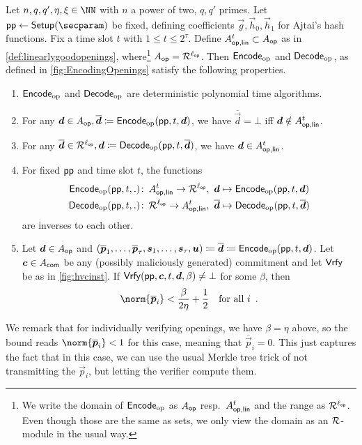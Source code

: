 \begin{theorem}\label{thm:EncodingOfOpenings}
Let $n,q,q',\eta,\xi\in\NN$ with $n$ a power of two, $q,q'$ primes.
Let $\params\gets\setup(\secparam)$ be fixed, defining coefficients $\vec{g},\vec{h}_0,\vec{h}_1$ for Ajtai's hash functions.
Fix a time slot $t$ with $1\leq t \leq 2^\tau$.
Define $A_{\mathsf{op,lin}}^{t}\subset A_{\mathsf{op}}$ as in \autoref{def:linearlygoodopenings}, where\footnote{We write the domain of $\mathsf{Encode}_{\mathrm{op}}$ as $A_{\mathsf{op}}$ resp.\ $A_{\mathsf{op,lin}}^{t}$ and the range as $\mathcal{R}^{\ell_{\mathsf{op}}}$. Even though those are the same as sets, we only view the domain as an $\mathcal{R}$-module in the usual way.} $A_{\mathsf{op}} = \mathcal{R}^{\ell_{\mathsf{op}}}$.
Then $\mathsf{Encode}_{\mathrm{op}}$ and $\mathsf{Decode}_{\mathrm{op}}$, as defined in \autoref{fig:EncodingOpenings} satisfy the following properties.
\begin{enumerate}
 \item $\mathsf{Encode}_{\mathrm{op}}$ and $\mathsf{Decode}_{\mathrm{op}}$ are deterministic polynomial time algorithms. \label{item:openencodeispt}
 \item For any $\boldsymbol{d}\in A_{\mathsf{op}},\overline{\boldsymbol{d}} \coloneqq \mathsf{Encode}_{\mathrm{op}}(\mathsf{pp},t, \boldsymbol{d})$, we have $\overline{\vec{d}} = \bot$ iff $\boldsymbol{d}\notin A_{\mathsf{op,lin}}^{t}$.\label{item:openencodeworks}
 \item For any $\overline{\boldsymbol{d}}\in\mathcal{R}^{\ell_{\mathsf{op}}}, \boldsymbol{d}\coloneqq \mathsf{Decode}_{\mathrm{op}}(\mathsf{pp},t, \overline{\boldsymbol{d}})$, we have $\boldsymbol{d}\in A_{\mathsf{op,lin}}^{t}$. \label{item:opendecodeworks}
 \item For fixed $\mathsf{pp}$ and time slot $t$, the functions 
 \begin{align*}
 \openencode(\params, t, .)\colon\,\modlinear{t} \to \ring^\oplen&,\ \vec{d}\mapsto \openencode(\params,t, \vec{d})\\
 \opendecode(\params, t, .)\colon\,\ring^\oplen \to \modlinear{t}&,\ \overline{\vec{d}}\mapsto \opendecode(\params,t, \overline{\vec{d}})
 \end{align*}
are inverses to each other.\label{item:openencodeinverse}
\item Let $\boldsymbol{d}\in A_{\mathsf{op}}$ and $(\overline{\boldsymbol{p}}_1,\ldots,\overline{\boldsymbol{p}}_\tau,\boldsymbol{s}_1,\ldots,\boldsymbol{s}_\tau,\boldsymbol{u}) \coloneqq \overline{\boldsymbol{d}}\coloneqq \mathsf{Encode}_{\mathrm{op}}(\mathsf{pp},t, \boldsymbol{d})$. Let $\boldsymbol{c}\in A_{\mathsf{com}}$ be any (possibly maliciously generated) commitment and let $\mathsf{Vrfy}$ be as in \autoref{fig:hvcinst}. If $\mathsf{Vrfy}(\mathsf{pp}, \boldsymbol{c}, t,\boldsymbol{d}, \beta) \neq \bot$ for some $\beta$, then \label{item:openencodebounds}
\[
 \norm{\overline{\vec{p}}_i} < \frac{\beta}{2\eta} + \frac12\quad\text{for all $i$}\enspace.
\]
\end{enumerate}
We remark that for individually verifying openings, we have $\beta=\eta$ above, so the bound reads $\norm{\overline{\vec{p}}_i} < 1$ for this case, meaning that $\overline{\vec{p}}_i = 0$.
This just captures the fact that in this case, we can use the usual Merkle tree trick of not transmitting the $\vec{p}_i$, but letting the verifier compute them.
\end{theorem}
